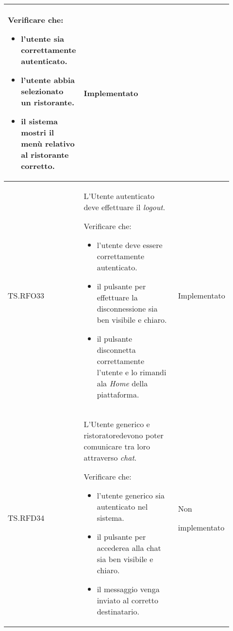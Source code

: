 \begin{longtable}{|p{0.10\linewidth}|p{0.70\linewidth}|p{0.12\linewidth}|}
	Verificare che:
	\begin{itemize}
		\item l'utente sia correttamente autenticato.
		\item l'utente abbia selezionato un ristorante.
		\item il sistema mostri il menù relativo al ristorante corretto.
	\end{itemize}                                                                &
	Implementato                                                                                                                                                   \\
	\hline
	TS.RFO33                                                                                                                        &
	L'Utente autenticato deve effettuare il \textit{logout}. \par
	Verificare che:
	\begin{itemize}
		\item l'utente deve essere correttamente autenticato.
		\item il pulsante per effettuare la disconnessione sia ben visibile e chiaro.
		\item il pulsante disconnetta correttamente l'utente e lo rimandi ala \textit{Home} della piattaforma.
	\end{itemize}                          &
	Implementato                                                                                                                                                   \\
	\hline
	TS.RFD34                                                                                                                        &
	L'Utente generico e ristoratore\g devono poter comunicare tra loro attraverso \textit{chat}. \par
	Verificare che:
	\begin{itemize}
		\item l'utente generico sia autenticato nel sistema.
		\item il pulsante per accederea alla chat sia ben visibile e chiaro.
		\item il messaggio venga inviato al corretto destinatario.
	\end{itemize}                                                            &
	Non \par implementato                                                                                                                                                   \\

\end{longtable}
